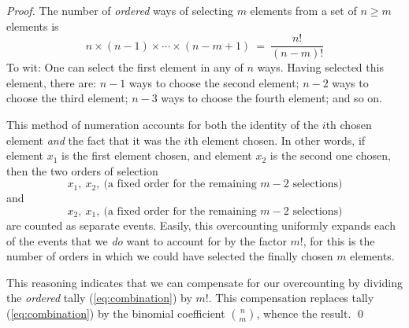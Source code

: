 \begin{proof}
The number of {\em ordered} ways of selecting $m$ elements from a set of $n \geq m$ elements is 
\begin{equation}
\label{eq:combination}
n \times (n-1) \times \cdots \times (n-m+1) \ = \ \frac{n!}{(n-m)!}
\end{equation}
To wit: One can select the first element in any of $n$ ways.  Having selected this element, there are: $n-1$ ways to choose the second element; $n-2$ ways to choose the third element; $n-3$ ways to choose the fourth element; and so on.

\smallskip

This method of numeration accounts for both the identity of the $i$th chosen element  {\em and} the fact that it was the $i$th element chosen.  In other words, if element $x_1$ is the first element chosen, and element $x_2$ is the second one chosen, then the two orders of selection
\[ x_1, \ x_2, \ \mbox{(a fixed order for the remaining $m-2$ selections)} \]
and 
\[ x_2, \ x_1, \ \mbox{(a fixed order for the remaining $m-2$ selections)} \]
are counted as separate events.  Easily, this overcounting uniformly
expands each of the events that we {\em do} want to account for by the
factor $m!$, for this is the number of orders in which we could have selected the finally chosen $m$ elements.

\smallskip

This reasoning indicates that we can compensate for our overcounting by dividing the {\em ordered} tally (\ref{eq:combination}) by $m!$.  This compensation replaces tally (\ref{eq:combination}) by the binomial coefficient $\displaystyle {n \choose m}$, whence the result.  \qed
\end{proof}

\bigskip

\noindent {}

